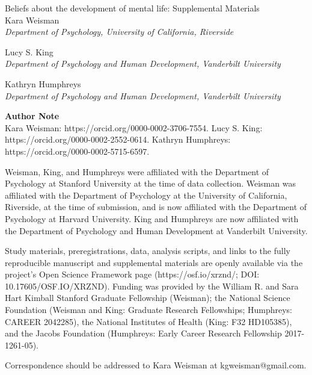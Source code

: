 \begin{titlepage}
    \begin{center}
        \vspace*{1in}
        {\Large Beliefs about the development of mental life: Supplemental Materials} \\[2cm]
        
        Kara Weisman\\
        \textit{Department of Psychology, University of California, Riverside}\par
        \vspace{0.5cm}
        Lucy S. King\\
        \textit{Department of Psychology and Human Development, Vanderbilt University}\par
        \vspace{0.5cm}
        Kathryn Humphreys\\
        \textit{Department of Psychology and Human Development, Vanderbilt University}\par
    
    \end{center}
    \vfill
    \textbf{Author Note} \\
    \setlength{\parindent}{2em}
    \indent Kara Weisman: https://orcid.org/0000-0002-3706-7554. Lucy S. King: https://orcid.org/0000-0002-2552-0614. Kathryn Humphreys: https://orcid.org/0000-0002-5715-6597.

    \indent Weisman, King, and Humphreys were affiliated with the Department of Psychology at Stanford University at the time of data collection. Weisman was affiliated with the Department of Psychology at the University of California, Riverside, at the time of submission, and is now affiliated with the Department of Psychology at Harvard University. King and Humphreys are now affiliated with the Department of Psychology and Human Development at Vanderbilt University. 

    \indent Study materials, preregistrations, data, analysis scripts, and links to the fully reproducible manuscript and supplemental materials are openly available via the project’s Open Science Framework page (https://osf.io/xrznd/; DOI: 10.17605/OSF.IO/XRZND). Funding was provided by the William R. and Sara Hart Kimball Stanford Graduate Fellowship (Weisman); the National Science Foundation (Weisman and King: Graduate Research Fellowships; Humphreys: CAREER 2042285), the National Institutes of Health (King: F32 HD105385), and the Jacobs Foundation (Humphreys: Early Career Research Fellowship 2017-1261-05).

    \indent Correspondence should be addressed to Kara Weisman at kgweisman@gmail.com.
\end{titlepage}
